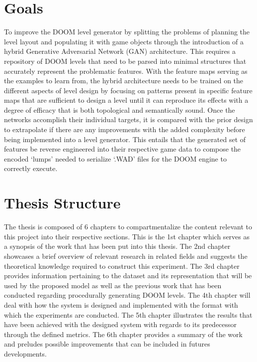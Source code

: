 \documentclass{Configuration_Files/PoliMi3i_thesis}
\begin{document}
\section{Goals}
To improve the DOOM level generator by splitting the problems of planning the level 
layout and populating it with game objects through the introduction of a hybrid 
Generative Adversarial Network (GAN) architecture. This requires a repository of DOOM 
levels that need to be parsed into minimal structures that accurately represent the problematic 
features. With the feature maps serving as the examples to learn from, the hybrid architecture needs to be 
trained on the different aspects of level design by focusing on patterns present in specific 
feature maps that are sufficient to design a level until it can reproduce its effects with a degree 
of efficacy that is both topological and semantically sound. Once the networks accomplish their 
individual targets, it is compared with the prior design to extrapolate if there are any improvements with the added 
complexity before being implemented into a level generator. This entails that the generated set of features 
be reverse engineered into their respective game data to compose the encoded ‘lumps’ needed to serialize ‘.WAD’ 
files for the DOOM engine to correctly execute.

\section{Thesis Structure}
The thesis is composed of 6 chapters to compartmentalize the content relevant to this 
project into their respective sections. This is the 1st chapter which serves as a synopsis 
of the work that has been put into this thesis. The 2nd chapter showcases a brief 
overview of relevant research in related fields and suggests the theoretical knowledge 
required to construct this experiment. The 3rd chapter provides information pertaining 
to the dataset and its representation that will be used by the proposed model as well 
as the previous work that has been conducted regarding procedurally generating  
DOOM levels. The 4th chapter will deal with how the system is designed and implemented
with the format with which the experiments are conducted. The 5th chapter illustrates 
the results that have been achieved with the designed system with regards to its 
predecessor through the defined metrics. The 6th chapter provides a summary of the 
work and preludes possible improvements that can be included in futures 
developments.
\end{document}
